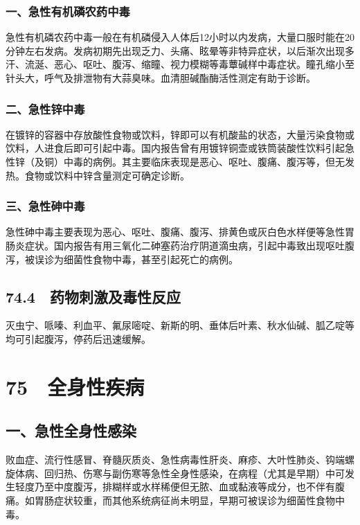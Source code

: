 \subsubsection{一、急性有机磷农药中毒}

急性有机磷农药中毒一般在有机磷侵入人体后12小时以内发病，大量口服时能在20分钟左右发病。发病初期先出现乏力、头痛、眩晕等非特异症状，以后渐次出现多汗、流涎、恶心、呕吐、腹泻、缩瞳、视力模糊等毒蕈碱样中毒症状。瞳孔缩小至针头大，呼气及排泄物有大蒜臭味。血清胆碱酯酶活性测定有助于诊断。

\subsubsection{二、急性锌中毒}

在镀锌的容器中存放酸性食物或饮料，锌即可以有机酸盐的状态，大量污染食物或饮料，人进食后即可引起中毒。国内报告曾有用镀锌铜壶或铁筒装酸性饮料引起急性锌（及铜）中毒的病例。其主要临床表现是恶心、呕吐、腹痛、腹泻等，但无发热。食物或饮料中锌含量测定可确定诊断。

\subsubsection{三、急性砷中毒}

急性砷中毒主要表现为恶心、呕吐、腹痛、腹泻、排黄色或灰白色水样便等急性胃肠炎症状。国内报告有用三氧化二砷塞药治疗阴道滴虫病，引起中毒致出现呕吐腹泻，被误诊为细菌性食物中毒，甚至引起死亡的病例。

\subsection{74.4　药物刺激及毒性反应}

灭虫宁、哌嗪、利血平、氟尿嘧啶、新斯的明、垂体后叶素、秋水仙碱、胍乙啶等均可引起腹泻，停药后迅速缓解。

\protect\hypertarget{text00187.html}{}{}

\section{75　全身性疾病}

\subsection{一、急性全身性感染}

败血症、流行性感冒、脊髓灰质炎、急性病毒性肝炎、麻疹、大叶性肺炎、钩端螺旋体病、回归热、伤寒与副伤寒等急性全身性感染，在病程（尤其是早期）中可发生轻度乃至中度腹泻，排糊样或水样稀便但无脓、血或黏液等成分，也不伴有腹痛。如胃肠症状较重，而其他系统病征尚未明显，早期可被误诊为细菌性食物中毒。


